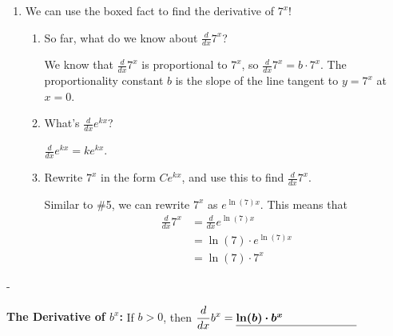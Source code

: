 \documentclass{article}
\makeatletter
\newlength{\tipmargin}
\renewenvironment{framed}{
  \setlength{\tipmargin}{\textwidth-\linewidth}
  \advance\@totalleftmargin-\tipmargin
  \def\FrameCommand{\hspace{\tipmargin}\fbox}%
  \advance\linewidth\tipmargin
  \MakeFramed {\advance\hsize-\width \FrameRestore}%
}
{\endMakeFramed}
\makeatother
\begin{document}
\begin{enumerate}[resume]
\item  We can use the boxed fact to find the derivative of $7^x$!

  \begin{enumerate}
  \item
    \begin{problem}
      So far, what do we know about $\frac{d}{dx} 7^x$?   
      \vfill
    \end{problem}

    \begin{solution}
      We know that $\frac{d}{dx} 7^x$ is proportional to
      $7^x$, so $\frac{d}{dx} 7^x = b \cdot 7^x$. The proportionality constant $b$ is the slope
      of the line tangent to $y=7^x$ at $x=0$. 
    \end{solution}

  \item
    \begin{problem}
      What's $\frac{d}{dx} e^{kx}$?
      \vfill
    \end{problem}

    \begin{solution}
      $\frac{d}{dx} e^{kx} = ke^{kx}$.
    \end{solution}

  \item    
    \begin{problem}[\nstretch{1.25}]
      Rewrite $7^x$ in the form $C e^{kx}$, and use this to find $\frac{d}{dx} 7^{x} $.
      \vfill 
    \end{problem}

    \begin{solution}
      Similar to \#5, we can rewrite $7^x$ as $e^{\ln(7)x}$.
      This means that
      \begin{align*}
        \frac{d}{dx} 7^x &= \frac{d}{dx} e^{\ln(7)x} \\
        &= \ln(7) \cdot e^{\ln(7)x}\\
        &= \ln(7) \cdot 7^x
      \end{align*}
    \end{solution}

  \end{enumerate}

\end{enumerate}
\begin{framed}
  \textbf{The Derivative of $b^x$:} If $b > 0$, then
  $\displaystyle \frac{d}{dx} b^x = 
  \fitb[\vphantom{\dfrac{1}{1}}]{1.5in}{\ln(b) \cdot b^x}$
\end{framed}
\end{document}
